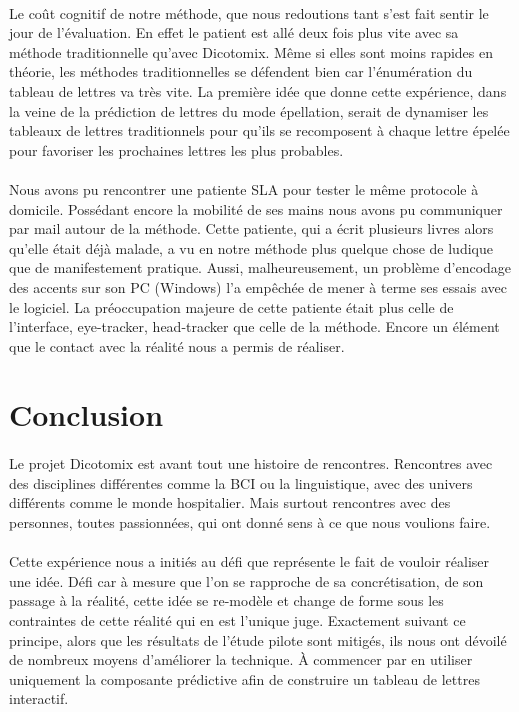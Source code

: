 \documentclass[11pt,a4paper]{article}
\theoremstyle{plain}
\theoremstyle{definition}
\begin{document}
 \paragraph{} Le coût cognitif de notre méthode, que nous redoutions tant s'est fait sentir le jour de l'évaluation. En effet le patient est allé deux fois plus vite avec sa 
 méthode traditionnelle qu'avec Dicotomix. Même si elles sont moins rapides en théorie, les méthodes traditionnelles se défendent bien car l'énumération du tableau de lettres
 va très vite. La première idée que donne cette expérience, dans la veine de la prédiction de lettres du mode épellation, serait de dynamiser les tableaux de lettres traditionnels
 pour qu'ils se recomposent à chaque lettre épelée pour favoriser les prochaines lettres les plus probables. 

\paragraph{}Nous avons pu rencontrer une patiente SLA pour tester le même protocole à domicile. Possédant encore la mobilité de ses mains nous avons pu communiquer par mail autour de la méthode.
Cette patiente, qui a écrit plusieurs livres alors qu'elle était déjà malade, a vu en notre méthode plus quelque chose de ludique que de manifestement pratique. Aussi, malheureusement, un problème 
d'encodage des accents sur son PC (Windows) l'a empêchée de mener à terme ses essais avec le logiciel. La préoccupation majeure de cette patiente était plus celle de l'interface, eye-tracker, head-tracker que
celle de la méthode. Encore un élément que le contact avec la réalité nous a permis de réaliser.

\section{Conclusion}

\paragraph{} Le projet Dicotomix est avant tout une histoire de rencontres. Rencontres avec des disciplines différentes comme la BCI ou la linguistique, avec des univers différents comme le monde hospitalier. 
Mais surtout rencontres avec des personnes, toutes passionnées, qui ont donné sens à ce que nous voulions faire.
 
\paragraph{}Cette expérience nous a initiés au défi que représente le fait de vouloir réaliser une idée. Défi car à mesure que l'on se rapproche de sa concrétisation, de son passage à la réalité, cette idée se re-modèle et change de forme sous les contraintes de cette réalité qui en est l'unique juge. Exactement suivant ce principe, alors que les résultats de l'étude pilote sont mitigés, ils nous ont dévoilé de nombreux moyens d'améliorer la technique. À commencer par en utiliser uniquement la composante prédictive afin de construire un tableau de lettres interactif.
\end{document}
